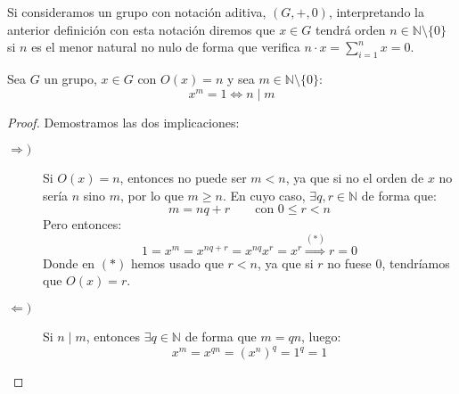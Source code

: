 \begin{notacion}
    Si consideramos un grupo con notación aditiva, $(G,+,0)$, interpretando la anterior definición con esta notación diremos que $x\in G$ tendrá orden $n\in \mathbb{N}\setminus\{0\}$ si $n$ es el menor natural no nulo de forma que verifica $n\cdot x = \sum\limits_{i=1}^{n}x = 0$.
\end{notacion}

\begin{prop}\label{prop:divide_orden}
    Sea $G$ un grupo, $x\in G$ con $O(x) = n$ y sea $m\in \mathbb{N}\setminus\{0\}$:
    \begin{equation*}
        x^m = 1 \Longleftrightarrow n\mid m
    \end{equation*}
    \begin{proof}
        Demostramos las dos implicaciones:
        \begin{description}
            \item [$\Longrightarrow)$] 
                Si $O(x)=n$, entonces no puede ser $m<n$, ya que si no el orden de $x$ no sería $n$ sino $m$, por lo que $m\geq n$. En cuyo caso, $\exists q,r\in \mathbb{N}$ de forma que:
                \begin{equation*}
                    m = nq + r \qquad \text{con\ }0\leq r < n 
                \end{equation*}
                Pero entonces:
                \begin{equation*}
                    1 = x^m = x^{nq+r} = x^{nq} x^r = x^r \stackrel{(\ast)}{\Longrightarrow} r = 0
                \end{equation*}
                Donde en $(\ast)$ hemos usado que $r<n$, ya que si $r$ no fuese $0$, tendríamos que $O(x)=r$.
            \item [$\Longleftarrow)$] Si $n\mid m$, entonces $\exists q\in \mathbb{N}$ de forma que $m = qn$, luego:
                \begin{equation*}
                    x^m = x^{qn} = {(x^n)}^{q} = 1^q = 1
                \end{equation*}
        \end{description}
    \end{proof}
\end{prop}

